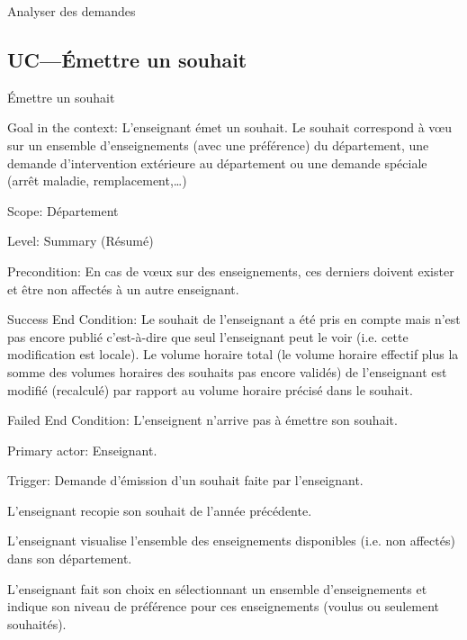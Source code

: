 \begin{ocl}
\begin{usecase}{Analyser des demandes}
\end{usecase}

\subsection{UC---Émettre un souhait}

\begin{usecase}{\'Emettre un souhait}\label{usecase:souhait}
\begin{information}

\item [{Goal in the context:}]
 L'enseignant émet un souhait. Le souhait correspond à v\oe u sur un ensemble d'enseignements (avec une préférence) du département, une demande d'intervention extérieure au département ou une demande spéciale (arrêt maladie, remplacement,\dots)

\item[Scope:] Département

\item [{Level:}] Summary (Résumé)

\item[{Precondition:}]
 En cas de vœux sur des enseignements, ces derniers doivent exister et être non affectés à un autre enseignant.

\item[{Success End Condition:}]
 Le souhait de l'enseignant a été pris en compte mais n'est pas encore publié c'est-à-dire que seul l'enseignant peut le voir (i.e. cette modification est locale). 
Le volume horaire total (le volume horaire effectif plus la somme des volumes horaires des souhaits pas encore validés) de l'enseignant est modifié (recalculé) par rapport au volume horaire précisé dans le souhait.

\item[{Failed End Condition:}] L'enseignent n'arrive pas à émettre son souhait.
\item[{Primary actor:}] Enseignant.
\item[{Trigger:}] Demande d'émission d'un souhait faite par l'enseignant.
\end{information}

 \begin{scenario}
	 \item L'enseignant recopie son souhait de l'année précédente.
	 \item L'enseignant visualise l'ensemble des enseignements disponibles (i.e. non affectés) dans son département.
	 \item L'enseignant fait son choix en sélectionnant un ensemble d'enseignements et indique son niveau de préférence pour ces enseignements (voulus ou seulement souhaités).
 \end{scenario}



\end{usecase}
\end{ocl}
